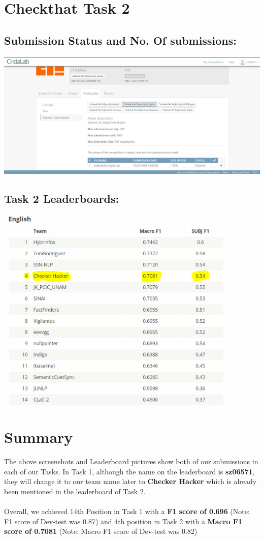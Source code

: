\documentclass{article}
\begin{document}
\section{\textcolor{sectioncolor}{Checkthat Task 2}}

\subsection{Submission Status and No. Of submissions:}
\includegraphics[width=15cm]{Task2_Status.jpg}

\subsection{Task 2 Leaderboards:}
\includegraphics[width=12cm]{Task2_LeaderBoards.png}

\section{\textcolor{sectioncolor}{Summary}}

The above screenshots and Leaderboard pictures show both of our submissions in each of our Tasks. In Task 1, although the name on the leaderboard is \textbf{sz06571}, they will change it to our team name later to \textbf{Checker Hacker} which is already been mentioned in the leaderboard of Task 2.
\\\\
Overall, we achieved 14th Position in Task 1 with a \textbf{F1 score of 0.696} (Note: F1 score of Dev-test was 0.87) and 4th position in Task 2 with a \textbf{Macro F1 score of 0.7081} (Note: Macro F1 score of Dev-test was 0.82)
\end{document}
